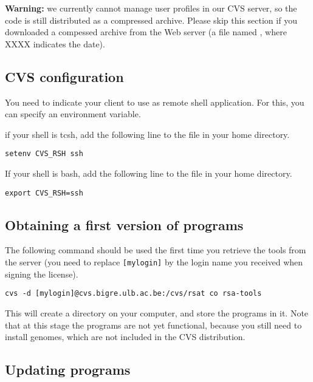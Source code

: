 \documentclass[12pt,a4paper, oneside]{scrreprt} %
\begin{document}
\textbf{Warning:} we currently cannot manage user profiles in our CVS
server, so the \RSAT code is still distributed as a compressed
archive. Please skip this section if you downloaded a compessed
archive from the Web server (a file named
, where XXXX indicates the date).

\subsection{CVS configuration}

You need to indicate your  client to use 
as remote shell application. For this, you can specify an environment
variable.

if your shell is tcsh, add the following line to the 
file in your home directory.

\begin{lstlisting}
setenv CVS_RSH ssh
\end{lstlisting}


If your shell is bash, add the following line to the 
file in your home directory.

\begin{lstlisting}
export CVS_RSH=ssh
\end{lstlisting}



\subsection{Obtaining a first version of \RSAT programs}

The following command should be used the first time you retrieve the
tools from the server (you need to replace \texttt{[mylogin]} by the
login name you received when signing the \RSAT license).

\begin{lstlisting}
cvs -d [mylogin]@cvs.bigre.ulb.ac.be:/cvs/rsat co rsa-tools
\end{lstlisting}


This will create a directory  on your computer, and
store the programs in it. Note that at this stage the programs are not
yet functional, because you still need to install genomes, which are
not included in the CVS distribution.

\subsection{Updating \RSAT programs}
\end{document}
